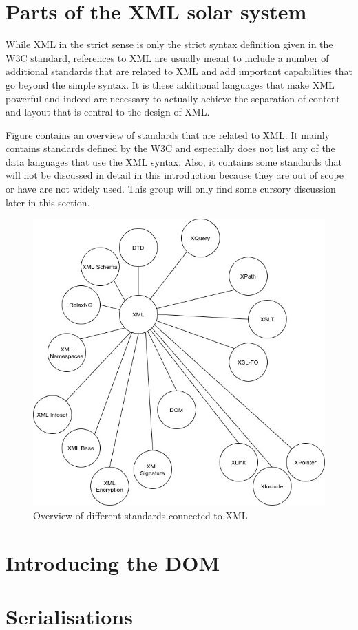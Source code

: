 \section{Parts of the XML solar system}
\par While XML in the strict sense is only the strict syntax definition given in the W3C
               standard, references to XML are usually meant to include a number of additional standards that are
               related to XML and add important capabilities that go beyond the simple syntax. It is these additional
               languages that make XML powerful and indeed are necessary to actually achieve the separation of content
               and layout that is central to the design of XML.
\par Figure  contains an overview of standards that are related to XML.
               It mainly contains standards defined by the W3C and especially does not list any of the data languages
               that use the XML syntax. Also, it contains some standards that will not be discussed in detail in this
               introduction because they are out of scope or have are not widely used. This group will only find some
               cursory discussion later in this section.
  \begin{figure}
    \includegraphics[width=\linewidth]{../images/x-solar-system.jpg}
    \caption{Overview of different standards connected to XML}
  \end{figure}

\section{Introducing the DOM}

\section{Serialisations}